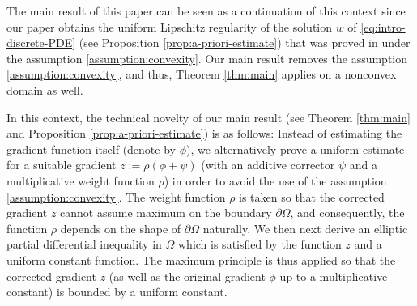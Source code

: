 \documentclass[11pt]{article}
\numberwithin{equation}{section}
\newtheorem{corollary}[theorem]{Corollary}
\begin{document}
The main result of this paper can be seen as a continuation of this context since our paper obtains the uniform Lipschitz regularity of the solution $w$ of \eqref{eq:intro-discrete-PDE} (see Proposition \ref{prop:a-priori-estimate}) that was proved in \cite{EG25} under the assumption \eqref{assumption:convexity}. Our main result removes the assumption \eqref{assumption:convexity}, and thus, Theorem \ref{thm:main} applies on a nonconvex domain as well.



In this context, the technical novelty of our main result (see Theorem \ref{thm:main} and Proposition \ref{prop:a-priori-estimate}) is as follows: Instead of estimating the gradient function itself (denote by $\phi$), we alternatively prove a uniform estimate for a suitable gradient $z:=\rho(\phi + \psi)$ (with an additive corrector $\psi$ and a multiplicative weight function $\rho$) in order to avoid the use of the assumption \eqref{assumption:convexity}. The weight function $\rho$ is taken so that the corrected gradient $z$ cannot assume maximum on the boundary $\partial\Omega$, and consequently, the function $\rho$ depends on the shape of $\partial\Omega$ naturally. We then next derive an elliptic partial differential inequality in $\Omega$ which is satisfied by the function $z$ and a uniform constant function. The maximum principle is thus applied so that the corrected gradient $z$ (as well as the original gradient $\phi$ up to a multiplicative constant) is bounded by a uniform constant.





\end{document}

